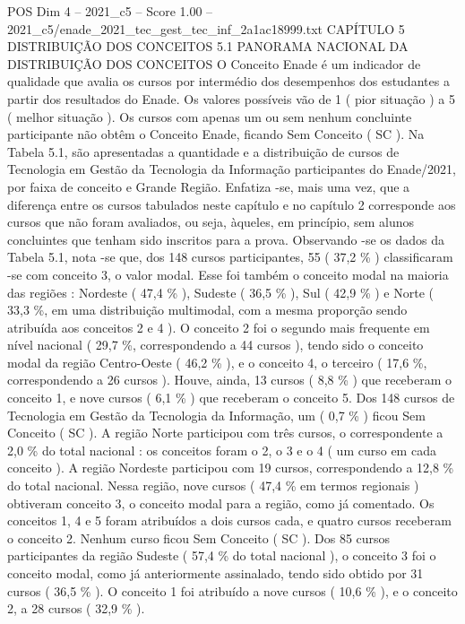 \begin{textsample}{POS Dim 4 – 2021\_c5 – Score 1.00 – 2021\_c5/enade\_2021\_tec\_gest\_tec\_inf\_2a1ac18999.txt}  \label{ex:f4_pos_213}
CAPÍTULO 5 DISTRIBUIÇÃO DOS CONCEITOS 5.1 PANORAMA NACIONAL DA DISTRIBUIÇÃO DOS CONCEITOS O Conceito Enade é um indicador de qualidade que avalia os cursos por intermédio dos desempenhos dos estudantes a partir dos resultados do Enade.
Os valores possíveis vão de 1 ( pior situação ) a 5 ( melhor situação ).
Os cursos com apenas um ou sem nenhum concluinte participante não obtêm o Conceito Enade, ficando Sem Conceito ( SC ).
Na Tabela 5.1, são apresentadas a quantidade e a distribuição de cursos de Tecnologia em Gestão da Tecnologia da Informação participantes do Enade/2021, por faixa de conceito e Grande Região.
Enfatiza -se, mais uma vez, que a diferença entre os cursos tabulados neste capítulo e no capítulo 2 corresponde aos cursos que não foram avaliados, ou seja, àqueles, em princípio, sem alunos concluintes que tenham sido inscritos para a prova.
Observando -se os dados da Tabela 5.1, nota -se que, dos 148 cursos participantes, 55 ( 37,2 \% ) classificaram -se com conceito 3, o valor modal.
Esse foi também o conceito modal na maioria das regiões : Nordeste ( 47,4 \% ), Sudeste ( 36,5 \% ), Sul ( 42,9 \% ) e Norte ( 33,3 \%, em uma distribuição multimodal, com a mesma proporção sendo atribuída aos conceitos 2 e 4 ).
O conceito 2 foi o segundo mais frequente em nível nacional ( 29,7 \%, correspondendo a 44 cursos ), tendo sido o conceito modal da região Centro-Oeste ( 46,2 \% ), e o conceito 4, o terceiro ( 17,6 \%, correspondendo a 26 cursos ).
Houve, ainda, 13 cursos ( 8,8 \% ) que receberam o conceito 1, e nove cursos ( 6,1 \% ) que receberam o conceito 5.
Dos 148 cursos de Tecnologia em Gestão da Tecnologia da Informação, um ( 0,7 \% ) ficou Sem Conceito ( SC ).
A região Norte participou com três cursos, o correspondente a 2,0 \% do total nacional : os conceitos foram o 2, o 3 e o 4 ( um curso em cada conceito ).
A região Nordeste participou com 19 cursos, correspondendo a 12,8 \% do total nacional.
Nessa região, nove cursos ( 47,4 \% em termos regionais ) obtiveram conceito 3, o conceito modal para a região, como já comentado.
Os conceitos 1, 4 e 5 foram atribuídos a dois cursos cada, e quatro cursos receberam o conceito 2.
Nenhum curso ficou Sem Conceito ( SC ).
Dos 85 cursos participantes da região Sudeste ( 57,4 \% do total nacional ), o conceito 3 foi o conceito modal, como já anteriormente assinalado, tendo sido obtido por 31 cursos ( 36,5 \% ).
O conceito 1 foi atribuído a nove cursos ( 10,6 \% ), e o conceito 2, a 28 cursos ( 32,9 \% ).

\end{textsample}
